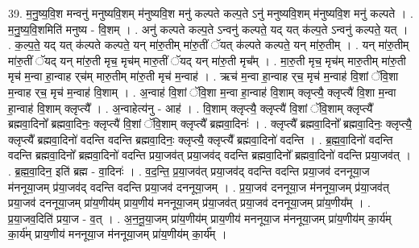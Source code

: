 \documentclass[17pt]{extarticle}
\begin{document}
39. म॒नु॒ष्य॒वि॒श मन्वनु॑ मनुष्यवि॒शम् म॑नुष्यवि॒श मनु॑ कल्पते कल्प॒ते ऽनु॑ मनुष्यवि॒शम् म॑नुष्यवि॒श मनु॑ कल्पते । . म॒नु॒ष्य॒वि॒शमिति॑ मनुष्य - वि॒शम् । . अनु॑ कल्पते कल्प॒ते ऽन्वनु॑ कल्पते॒ यद् यत् क॑ल्प॒ते ऽन्वनु॑ कल्पते॒ यत् । . क॒ल्प॒ते॒ यद् यत् क॑ल्पते कल्पते॒ यन् मा॑रु॒तीम् मा॑रु॒तीं ॅयत् क॑ल्पते कल्पते॒ यन् मा॑रु॒तीम् । . यन् मा॑रु॒तीम् मा॑रु॒तीं ॅयद् यन् मा॑रु॒ती मृच॒ मृच॑म् मारु॒तीं ॅयद् यन् मा॑रु॒ती मृच᳚म् । . मा॒रु॒ती मृच॒ मृच॑म् मारु॒तीम् मा॑रु॒ती मृच॑ म॒न्वा हा॒न्वाह र्‌च॑म् मारु॒तीम् मा॑रु॒ती मृच॑ म॒न्वाह॑ । . ऋच॑ म॒न्वा हा॒न्वाह र्‌च॒ मृच॑ म॒न्वाह॑ वि॒शां ॅवि॒शा म॒न्वाह र्‌च॒ मृच॑ म॒न्वाह॑ वि॒शाम् । . अ॒न्वाह॑ वि॒शां ॅवि॒शा म॒न्वा हा॒न्वाह॑ वि॒शाम् क्लृप्त्यै॒ क्लृप्त्यै॑ वि॒शा म॒न्वा हा॒न्वाह॑ वि॒शाम् क्लृप्त्यै᳚ । . अ॒न्वाहेत्य॑नु - आह॑ । . वि॒शाम् क्लृप्त्यै॒ क्लृप्त्यै॑ वि॒शां ॅवि॒शाम् क्लृप्त्यै᳚ ब्रह्मवा॒दिनो᳚ ब्रह्मवा॒दिनः॒ क्लृप्त्यै॑ वि॒शां ॅवि॒शाम् क्लृप्त्यै᳚ ब्रह्मवा॒दिनः॑ । . क्लृप्त्यै᳚ ब्रह्मवा॒दिनो᳚ ब्रह्मवा॒दिनः॒ क्लृप्त्यै॒ क्लृप्त्यै᳚ ब्रह्मवा॒दिनो॑ वदन्ति वदन्ति ब्रह्मवा॒दिनः॒ क्लृप्त्यै॒ क्लृप्त्यै᳚ ब्रह्मवा॒दिनो॑ वदन्ति । . ब्र॒ह्म॒वा॒दिनो॑ वदन्ति वदन्ति ब्रह्मवा॒दिनो᳚ ब्रह्मवा॒दिनो॑ वदन्ति प्रया॒जव॑त् प्रया॒जव॑द् वदन्ति ब्रह्मवा॒दिनो᳚ ब्रह्मवा॒दिनो॑ वदन्ति प्रया॒जव॑त् । . ब्र॒ह्म॒वा॒दिन॒ इति॑ ब्रह्म - वा॒दिनः॑ । . व॒द॒न्ति॒ प्र॒या॒जव॑त् प्रया॒जव॑द् वदन्ति वदन्ति प्रया॒जव॑ दननूया॒ज म॑ननूया॒जम् प्र॑या॒जव॑द् वदन्ति वदन्ति प्रया॒जव॑ दननूया॒जम् । . प्र॒या॒जव॑ दननूया॒ज म॑ननूया॒जम् प्र॑या॒जव॑त् प्रया॒जव॑ दननूया॒जम् प्रा॑य॒णीय॑म् प्राय॒णीय॑ मननूया॒जम् प्र॑या॒जव॑त् प्रया॒जव॑ दननूया॒जम् प्रा॑य॒णीय᳚म् । . प्र॒या॒जव॒दिति॑ प्रया॒ज - व॒त् । . अ॒न॒नू॒या॒जम् प्रा॑य॒णीय॑म् प्राय॒णीय॑ मननूया॒ज म॑ननूया॒जम् प्रा॑य॒णीय॑म् का॒र्य॑म् का॒र्य॑म् प्राय॒णीय॑ मननूया॒ज म॑ननूया॒जम् प्रा॑य॒णीय॑म् का॒र्य᳚म् । \newline
\end{document}
